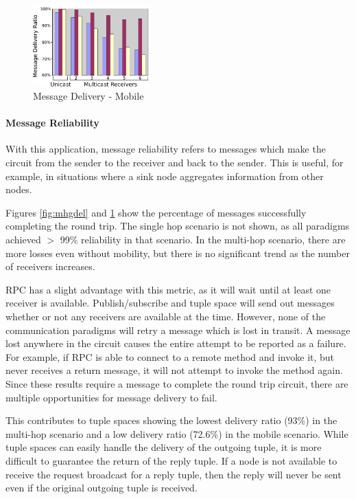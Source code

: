 \begin{figure}
\centering
\includegraphics[width = 0.40\textwidth, clip, trim = 0px 0px 0px 0px]{figures/mobile-group-delivery.pdf}
\caption{Message Delivery - Mobile}
\label{fig:mgdel}
\end{figure}


\paragraph{Message Reliability}\label{sec:group_reliability}

With this application, message reliability refers to messages which make the circuit from the sender to the receiver and back to the sender. This is useful, for example, in situations where a sink node aggregates information from other nodes.

Figures \ref{fig:mhgdel} and \ref{fig:mgdel} show the percentage of messages successfully completing the round trip. The single hop scenario is not shown, as all paradigms achieved $>$ 99\% reliability in that scenario. In the multi-hop scenario, there are more losses even without mobility, but there is no significant trend as the number of receivers increases.

RPC has a slight advantage with this metric, as it will wait until at least one receiver is available. Publish/subscribe and tuple space will send out messages whether or not any receivers are available at the time. However, none of the communication paradigms will retry a message which is lost in transit. A message lost anywhere in the circuit causes the entire attempt to be reported as a failure. For example, if RPC is able to connect to a remote method and invoke it, but never receives a return message, it will not attempt to invoke the method again. Since these results require a message to complete the round trip circuit, there are multiple opportunities for message delivery to fail. 

This contributes to tuple spaces showing the lowest delivery ratio (93\%) in the multi-hop scenario and a low delivery ratio (72.6\%) in the mobile scenario. While tuple spaces can easily handle the delivery of the outgoing tuple, it is more difficult to guarantee the return of the reply tuple. If a node is not available to receive the request broadcast for a reply tuple, then the reply will never be sent even if the original outgoing tuple is received.

